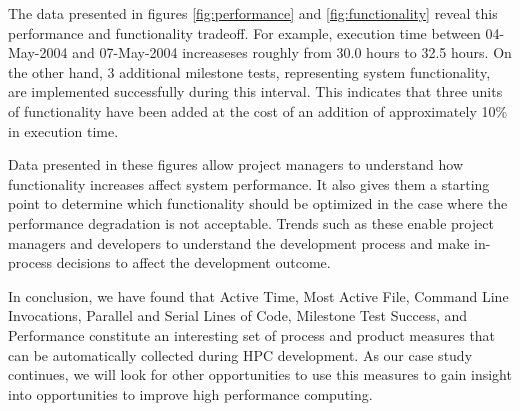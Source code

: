 \documentclass[10pt,twocolumn]{article}
\begin{document}
The data presented in figures \ref{fig:performance} and
\ref{fig:functionality} reveal this
performance and functionality tradeoff.  For example, execution time
between 04-May-2004 and 07-May-2004 increaseses roughly from 30.0
hours to 32.5 hours.  On the other hand, 3 additional milestone tests,
representing system functionality, are implemented successfully during
this interval.  This indicates that three units of functionality have been
added at the cost of an addition of approximately 10\% in execution time.

Data presented in these figures allow project managers to understand
how functionality increases affect system performance.  It also gives
them a starting point to determine which functionality should be
optimized in the case where the performance degradation is not
acceptable.  Trends such as these enable project managers and
developers to understand the development process and make in-process
decisions to affect the development outcome.

In conclusion, we have found that Active Time, Most Active File, Command
Line Invocations, Parallel and Serial Lines of Code, Milestone Test
Success, and Performance constitute an interesting set of process and
product measures that can be automatically collected during HPC
development.  As our case study continues, we will look for other
opportunities to use this measures to gain insight into opportunities to
improve high performance computing.



\end{document}

